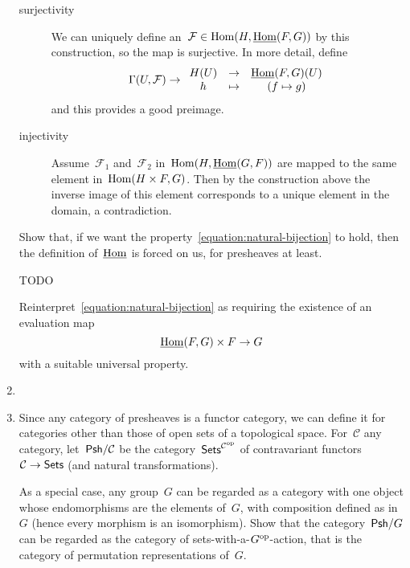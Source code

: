 \documentclass[a4paper,11pt,oneside,openany,article]{memoir}
\begin{document}
\begin{enumerate}
\begin{solution}
      \begin{description}
        \item[surjectivity] We can uniquely define an~$\mathcal{F}\in\operatorname{Hom}(H,\underline{\operatorname{Hom}}(F,G))$ by this construction, so the map is surjective. In more detail, define
          \begin{equation}
            \mathrm{\Gamma}(U,\mathcal{F})\to
            \begin{array}{ccc}
              H(U)&\to&\underline{\operatorname{Hom}}(F,G)(U) \\
              h&\mapsto& \left( f\mapsto g \right)
            \end{array}
          \end{equation}
          and this provides a good preimage.
        \item[injectivity] Assume~$\mathcal{F}_1$ and~$\mathcal{F}_2$ in~$\operatorname{Hom}(H,\underline{\operatorname{Hom}}(G,F))$ are mapped to the same element in~$\operatorname{Hom}(H\times F,G)$. Then by the construction above the inverse image of this element corresponds to a unique element in the domain, a contradiction.
      \end{description}
    \end{solution}

    Show that, if we want the property~\eqref{equation:natural-bijection} to hold, then the definition of~$\underline{\operatorname{Hom}}$ is forced on us, for presheaves at least.

    \begin{solution}
      TODO
    \end{solution}

    Reinterpret~\eqref{equation:natural-bijection} as requiring the existence of an evaluation map
    \begin{equation}
      \underline{\operatorname{Hom}}(F,G)\times F\to G
    \end{equation}
    with a suitable universal property.

  \item 

  \item Since any category of presheaves is a functor category, we can define it for categories other than those of open sets of a topological space. For~$\mathcal{C}$ any category, let~$\mathsf{Psh}/\mathcal{C}$ be the category~$\textsf{Sets}^{\mathcal{C}^{\operatorname{op}}}$ of contravariant functors~$\mathcal{C}\to\textsf{Sets}$ (and natural transformations).

    As a special case, any group~$G$ can be regarded as a category with one object whose endomorphisms are the elements of~$G$, with composition defined as in~$G$ (hence every morphism is an isomorphism). Show that the category~$\mathsf{Psh}/G$ can be regarded as the category of sets-with-a-$G^{\operatorname{op}}$-action, that is the category of permutation representations of~$G$.


\end{enumerate}
\end{document}
